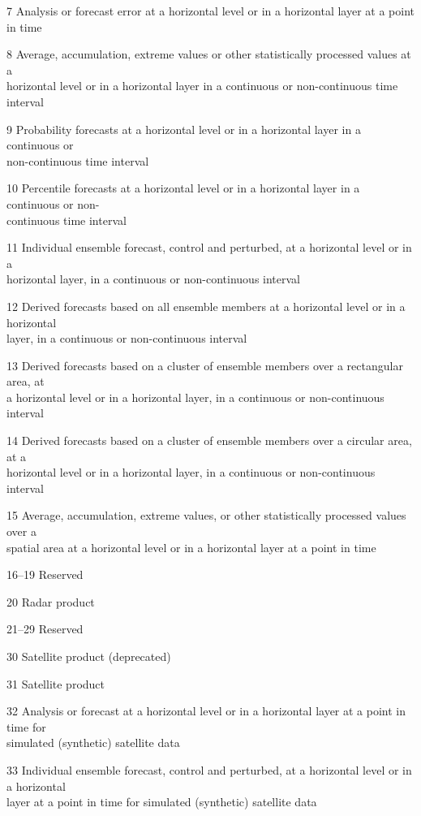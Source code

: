 7 Analysis or forecast error at a horizontal level or in a horizontal layer at a point in time

8 Average, accumulation, extreme values or other statistically processed values at a\\
horizontal level or in a horizontal layer in a continuous or non-continuous time interval

9 Probability forecasts at a horizontal level or in a horizontal layer in a continuous or\\
non-continuous time interval

10 Percentile forecasts at a horizontal level or in a horizontal layer in a continuous or non-\\
continuous time interval

11 Individual ensemble forecast, control and perturbed, at a horizontal level or in a\\
horizontal layer, in a continuous or non-continuous interval

12 Derived forecasts based on all ensemble members at a horizontal level or in a horizontal\\
layer, in a continuous or non-continuous interval

13 Derived forecasts based on a cluster of ensemble members over a rectangular area, at\\
a horizontal level or in a horizontal layer, in a continuous or non-continuous interval

14 Derived forecasts based on a cluster of ensemble members over a circular area, at a\\
horizontal level or in a horizontal layer, in a continuous or non-continuous interval

15 Average, accumulation, extreme values, or other statistically processed values over a\\
spatial area at a horizontal level or in a horizontal layer at a point in time

16--19 Reserved

20 Radar product

21--29 Reserved

30 Satellite product (deprecated)

31 Satellite product

32 Analysis or forecast at a horizontal level or in a horizontal layer at a point in time for\\
simulated (synthetic) satellite data

33 Individual ensemble forecast, control and perturbed, at a horizontal level or in a horizontal\\
layer at a point in time for simulated (synthetic) satellite data

